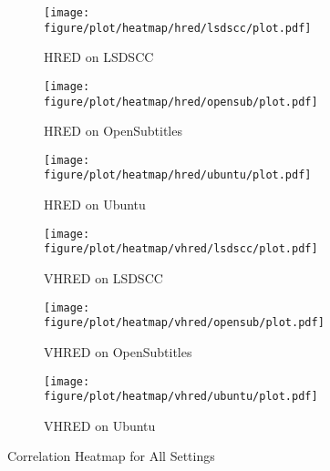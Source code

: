 \begin{figure}
    \centering
    \begin{subfigure}{0.33\linewidth}
        \centering
        \texttt{[image: figure/plot/heatmap/hred/lsdscc/plot.pdf]}
        \caption{HRED on LSDSCC}
    \end{subfigure}%
    \begin{subfigure}{0.33\linewidth}
        \centering
        \texttt{[image: figure/plot/heatmap/hred/opensub/plot.pdf]}
        \caption{HRED on OpenSubtitles}
    \end{subfigure}%
    \begin{subfigure}{0.33\linewidth}
        \centering
        \texttt{[image: figure/plot/heatmap/hred/ubuntu/plot.pdf]}
        \caption{HRED on Ubuntu}
    \end{subfigure}
    \begin{subfigure}{0.33\linewidth}
        \centering
        \texttt{[image: figure/plot/heatmap/vhred/lsdscc/plot.pdf]}
        \caption{VHRED on LSDSCC}
    \end{subfigure}%
    \begin{subfigure}{0.33\linewidth}
        \centering
        \texttt{[image: figure/plot/heatmap/vhred/opensub/plot.pdf]}
        \caption{VHRED on OpenSubtitles}
    \end{subfigure}%
    \begin{subfigure}{0.33\linewidth}
        \centering
        \texttt{[image: figure/plot/heatmap/vhred/ubuntu/plot.pdf]}
        \caption{VHRED on Ubuntu}
    \end{subfigure}
    \caption{Correlation Heatmap for All Settings}
    \label{fig:corr_heatmap}
\end{figure}

